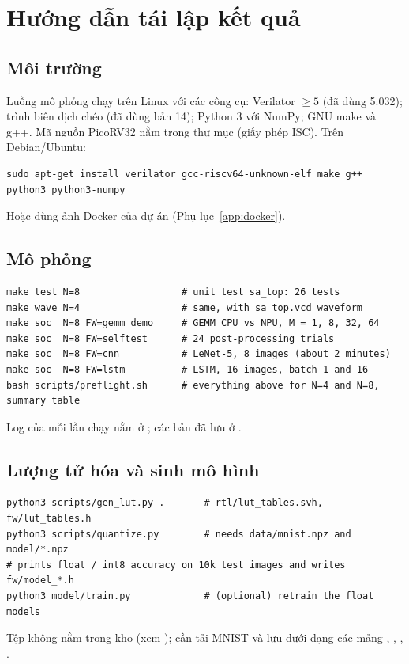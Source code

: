\chapter{Hướng dẫn tái lập kết quả}
\label{app:repro}

\section{Môi trường}
Luồng mô phỏng chạy trên Linux với các công cụ: Verilator $\ge5$ (đã dùng 5.032); trình biên dịch chéo  (đã dùng bản 14); Python 3 với NumPy; GNU make và g++. Mã nguồn PicoRV32 nằm trong thư mục  (giấy phép ISC). Trên Debian/Ubuntu:
\begin{lstlisting}[style=codebash]
sudo apt-get install verilator gcc-riscv64-unknown-elf make g++ python3 python3-numpy
\end{lstlisting}
Hoặc dùng ảnh Docker của dự án (Phụ lục~\ref{app:docker}).

\section{Mô phỏng}
\begin{lstlisting}[style=codebash]
make test N=8                  # unit test sa_top: 26 tests
make wave N=4                  # same, with sa_top.vcd waveform
make soc  N=8 FW=gemm_demo     # GEMM CPU vs NPU, M = 1, 8, 32, 64
make soc  N=8 FW=selftest      # 24 post-processing trials
make soc  N=8 FW=cnn           # LeNet-5, 8 images (about 2 minutes)
make soc  N=8 FW=lstm          # LSTM, 16 images, batch 1 and 16
bash scripts/preflight.sh      # everything above for N=4 and N=8, summary table
\end{lstlisting}
Log của mỗi lần chạy nằm ở ; các bản đã lưu ở .

\section{Lượng tử hóa và sinh mô hình}
\begin{lstlisting}[style=codebash]
python3 scripts/gen_lut.py .       # rtl/lut_tables.svh, fw/lut_tables.h
python3 scripts/quantize.py        # needs data/mnist.npz and model/*.npz
# prints float / int8 accuracy on 10k test images and writes fw/model_*.h
python3 model/train.py             # (optional) retrain the float models
\end{lstlisting}
Tệp  không nằm trong kho (xem ); cần tải MNIST và lưu dưới dạng các mảng , , , .

